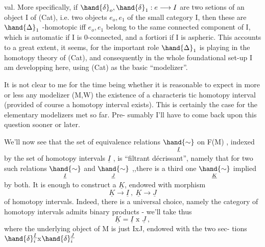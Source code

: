 val. More specifically, if $\hand{\delta}_o,\hand{\delta}_1 : e \longrightarrow I$ are two setions of an
object I of (Cat), i.e. two objects $e_o,e_1$ of the small category I, then
these are $\hand{\Delta}_1$ -homotopic iff $e_o,e_1$ belong to the same connected component
of I, which is automatic if I is 0-connected, and a fortiori if I is
aspheric. This accounts to a great extent, it seems, for the important
role $\hand{\Delta}_1$ is playing in the homotopy theory of (Cat), and consequently in
the whole foundational set-up I am developping here, using (Cat) as the
basic ``modelizer''.

It is not clear to me for the time being whether it is reasonable to
expect in more or less any modelizer (M,W) the existence of a characteris%
tic homotopy interval (provided of course a homotopy interval exists).
This is certainly the case for the elementary modelizers met so far. Pre-%
sumably I'll have to come back upon this question sooner or later.

We'll now see that the set of equivalence relations $\underset{\underline{I}}{\hand{\sim}}$ on F(M) ,
indexed by the set of homotopy intervals $\underline{I}$ , is ``filtrant d\'ecrissant'',
namely that for two such relations $\underset{\underline{I}}{\hand{\sim}}$ and $\underset{\underline{J}}{\hand{\sim}}$ ,,there is a third  one\hand{,}
$\underset{\underline{K}}{\hand{\sim}}$ implied by both. It is enough to construct a $\underline{K}$, endowed with morphism
\[ \underline{K} \longrightarrow \underline{I} \ , \ \underline{K} \longrightarrow \underline{J} \]
of homotopy intervals. Indeed, there is a universal choice, namely the
category of homotopy intervals admits binary products - we'll take thus
\[ \underline{K} = \underline{I} \text{ x } \underline{J} \ , \]
where the underlying object of M is just IxJ, endowed with the two sec-%
tions $\hand{\delta}^{\underline{I}}_{i}$x$\hand{\delta}^{\underline{J}}_{i}$ 

